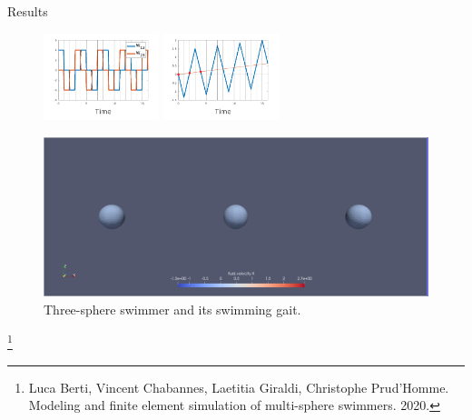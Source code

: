 \documentclass{beamer}
\begin{document}
\begin{frame}{Results}
\begin{figure}
{
		}
		\includegraphics[width=0.3\textwidth]{W_cl.png}
		\includegraphics[width=0.3\textwidth]{CM_evolution_1.png}
		\caption{Three-sphere swimmer and its swimming gait.}
		
		\label{Fig:results}
		\begin{center}
			\includegraphics[width=0.5\linewidth]{Threespheres.png}
		\end{center}
	\end{figure}
\footnote{\tiny Luca Berti, Vincent Chabannes, Laetitia Giraldi, Christophe Prud'Homme. Modeling and finite element simulation of multi-sphere swimmers. 2020.}

	\end{frame}
%			
%			
\end{document}
